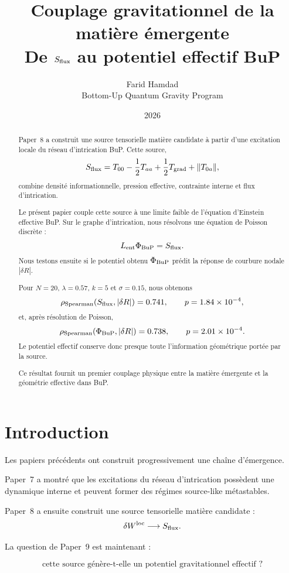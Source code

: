 \documentclass[11pt,a4paper]{article}
\title{
\textbf{Couplage gravitationnel de la matière émergente}\\[0.4em]
\large De \(S_{\rm flux}\) au potentiel effectif BuP
}
\author{
Farid Hamdad\\
\small Bottom-Up Quantum Gravity Program
}
\date{2026}
\begin{document}
\maketitle

\begin{abstract}

Paper~8 a construit une source tensorielle matière candidate à partir d'une
excitation locale du réseau d'intrication BuP. Cette source,
\[
S_{\rm flux}
=
T_{00}
-\frac12T_{aa}
+
\frac12T_{\rm grad}
+
\|T_{0a}\|,
\]
combine densité informationnelle, pression effective, contrainte interne et
flux d'intrication.

Le présent papier couple cette source à une limite faible de l'équation
d'Einstein effective BuP. Sur le graphe d'intrication, nous résolvons une
équation de Poisson discrète :
\[
L_{\rm ent}\Phi_{\rm BuP}
=
S_{\rm flux}.
\]
Nous testons ensuite si le potentiel obtenu \(\Phi_{\rm BuP}\) prédit la
réponse de courbure nodale \(|\delta R|\).

Pour \(N=20\), \(\lambda=0.57\), \(k=5\) et \(\sigma=0.15\), nous obtenons
\[
\rho_{\rm Spearman}(S_{\rm flux},|\delta R|)
=
0.741,
\qquad
p=1.84\times10^{-4},
\]
et, après résolution de Poisson,
\[
\rho_{\rm Spearman}(\Phi_{\rm BuP},|\delta R|)
=
0.738,
\qquad
p=2.01\times10^{-4}.
\]
Le potentiel effectif conserve donc presque toute l'information géométrique
portée par la source.

Ce résultat fournit un premier couplage physique entre la matière émergente
et la géométrie effective dans BuP.

\end{abstract}

\tableofcontents

\section{Introduction}

Les papiers précédents ont construit progressivement une chaîne d'émergence.

Paper~7 a montré que les excitations du réseau d'intrication possèdent une
dynamique interne et peuvent former des régimes source-like métastables.

Paper~8 a ensuite construit une source tensorielle matière candidate :
\[
\delta W^{\rm loc}
\longrightarrow
S_{\rm flux}.
\]

La question de Paper~9 est maintenant :

\[
\boxed{
\text{cette source génère-t-elle un potentiel gravitationnel effectif ?}
}
\]
\end{document}
